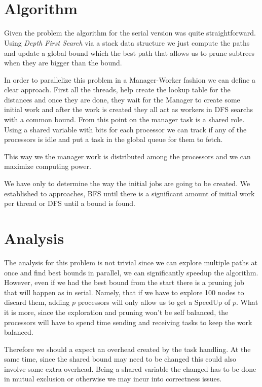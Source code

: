 \documentclass[a4paper]{article}
\title{\HWTitle \\ \vspace{.25cm} \large\HWSubtitle}
\author{\HWAuthorName}
\date{\HWDueDate}
\begin{document}
\maketitle
\thispagestyle{fancy}

\section{Algorithm}
    Given the problem the algorithm for the serial version was quite straightforward. Using \emph{Depth First Search} via a stack data structure we just compute the paths and update a global bound which the best path that allows us to prune subtrees when they are bigger than the bound.

    In order to parallelize this problem in a Manager-Worker fashion we can define a clear approach. First all the threads, help create the lookup table for the distances and once they are done, they wait for the Manager to create some initial work and after the work is created they all act as workers in DFS searchs with a common bound. From this point on the manager task is a shared role. Using a shared variable with bits for each processor we can track if any of the processors is idle and put a task in the global queue for them to fetch.

    This way we the manager work is distributed among the processors and we can maximize computing power.

    We have only to determine the way the initial jobs are going to be created. We established to approaches, BFS until there is a significant amount of initial work per thread or DFS until a bound is found.

\section{Analysis}
    The analysis for this problem is not trivial since we can explore multiple paths at once and find best bounds in parallel, we can significantly speedup the algorithm. However, even if we had the best bound from the start there is a pruning job that will happen as in serial. Namely, that if we have to explore 100 nodes to discard them, adding $p$ processors will only allow us to get a SpeedUp of $p$. What it is more, since the exploration and pruning won't be self balanced, the processors will have to spend time sending and receiving tasks to keep the work balanced.

    Therefore we should a expect an overhead created by the task handling. At the same time, since the shared bound may need to be changed this could also involve some extra overhead. Being a shared variable the changed has to be done in mutual exclusion or otherwise we may incur into correctness issues.
\end{document}
